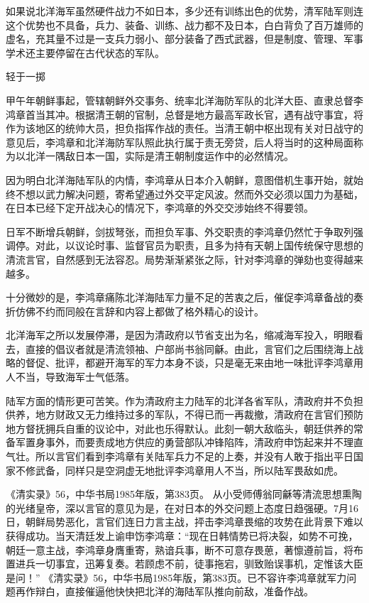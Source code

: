 \documentclass[12pt,UTF8]{ctexbook}
\begin{document}
如果说北洋海军虽然硬件战力不如日本，多少还有训练出色的优势，清军陆军则连这个优势也不具备，兵力、装备、训练、战力都不及日本，白白背负了百万雄师的虚名，充其量不过是一支兵力弱小、部分装备了西式武器，但是制度、管理、军事学术还主要停留在古代状态的军队。

轻于一掷

甲午年朝鲜事起，管辖朝鲜外交事务、统率北洋海防军队的北洋大臣、直隶总督李鸿章首当其冲。根据清王朝的官制，总督是地方最高军政长官，遇有战守事宜，将作为该地区的统帅大员，担负指挥作战的责任。当清王朝中枢出现有关对日战守的意见后，李鸿章和北洋海防军队照此执行属于责无旁贷，后人将当时的这种局面称为以北洋一隅敌日本一国，实际是清王朝制度运作中的必然情况。

因为明白北洋海陆军队的内情，李鸿章从日本介入朝鲜，意图借机生事开始，就始终不想以武力解决问题，寄希望通过外交平定风波。然而外交必须以国力为基础，在日本已经下定开战决心的情况下，李鸿章的外交交涉始终不得要领。

日军不断增兵朝鲜，剑拔弩张，而担负军事、外交职责的李鸿章仍然忙于争取列强调停。对此，以议论时事、监督官员为职责，且多为持有天朝上国传统保守思想的清流言官，自然感到无法容忍。局势渐渐紧张之际，针对李鸿章的弹劾也变得越来越多。

十分微妙的是，李鸿章痛陈北洋海陆军力量不足的苦衷之后，催促李鸿章备战的奏折仿佛不约而同般在言辞和内容上都做了格外精心的设计。

北洋海军之所以发展停滞，是因为清政府以节省支出为名，缩减海军投入，明眼看去，直接的倡议者就是清流领袖、户部尚书翁同龢。由此，言官们之后围绕海上战略的督促、批评，都避开海军的军力本身不谈，只是毫无来由地一味批评李鸿章用人不当，导致海军士气低落。

陆军方面的情形更可苦笑。作为清政府主力陆军的北洋各省军队，清政府并不负担供养，地方财政又无力维持过多的军队，不得已而一再裁撤，清政府在言官们预防地方督抚拥兵自重的议论中，对此也乐得默认。此刻一朝大敌临头，朝廷供养的常备军置身事外，而要责成地方供应的勇营部队冲锋陷阵，清政府申饬起来并不理直气壮。所以言官们看到李鸿章有关陆军兵力不足的上奏，并没有人敢于指出平日国家不修武备，同样只是空洞虚无地批评李鸿章用人不当，所以陆军畏敌如虎。

《清实录》56，中华书局1985年版，第383页。
从小受师傅翁同龢等清流思想熏陶的光绪皇帝，深以言官的意见为是，在对日本的外交问题上态度日趋强硬。7月16日，朝鲜局势恶化，言官们连日力言主战，抨击李鸿章畏缩的攻势在此背景下难以获得成功。当天清廷发上谕申饬李鸿章：“现在日韩情势已将决裂，如势不可挽，朝廷一意主战，李鸿章身膺重寄，熟谙兵事，断不可意存畏葸，著懔遵前旨，将布置进兵一切事宜，迅筹复奏。若顾虑不前，徒事拖宕，驯致贻误事机，定惟该大臣是问！” 《清实录》56，中华书局1985年版，第383页。已不容许李鸿章就军力问题再作辩白，直接催逼他快快把北洋的海陆军队推向前敌，准备作战。
\end{document}
